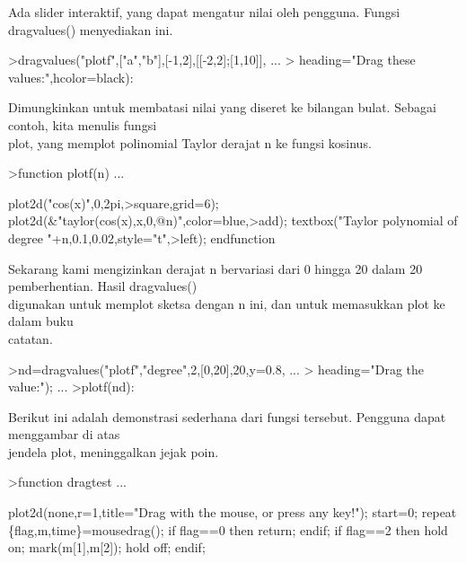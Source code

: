 \documentclass[a4paper,10pt]{article}
\begin{document}
\begin{eulernotebook}
\begin{eulercomment}
\begin{eulercomment}
\begin{eulercomment}
\begin{eulercomment}
\begin{eulercomment}
\begin{eulercomment}
\begin{eulercomment}
Ada slider interaktif, yang dapat mengatur nilai oleh pengguna. Fungsi
dragvalues() menyediakan ini.
\end{eulercomment}
\begin{eulerprompt}
>dragvalues("plotf",["a","b"],[-1,2],[[-2,2];[1,10]], ...
>  heading="Drag these values:",hcolor=black):
\end{eulerprompt}
\begin{eulercomment}
Dimungkinkan untuk membatasi nilai yang diseret ke bilangan bulat.
Sebagai contoh, kita menulis fungsi\\
plot, yang memplot polinomial Taylor derajat n ke fungsi kosinus.
\end{eulercomment}
\begin{eulerprompt}
>function plotf(n) ...
\end{eulerprompt}
\begin{eulerudf}
  plot2d("cos(x)",0,2pi,>square,grid=6);
  plot2d(&"taylor(cos(x),x,0,@n)",color=blue,>add);
  textbox("Taylor polynomial of degree "+n,0.1,0.02,style="t",>left);
  endfunction
\end{eulerudf}
\begin{eulercomment}
Sekarang kami mengizinkan derajat n bervariasi dari 0 hingga 20 dalam
20 pemberhentian. Hasil dragvalues()\\
digunakan untuk memplot sketsa dengan n ini, dan untuk memasukkan plot
ke dalam buku\\
catatan.
\end{eulercomment}
\begin{eulerprompt}
>nd=dragvalues("plotf","degree",2,[0,20],20,y=0.8, ...
>   heading="Drag the value:"); ...
>plotf(nd):
\end{eulerprompt}
\begin{eulercomment}
Berikut ini adalah demonstrasi sederhana dari fungsi tersebut.
Pengguna dapat menggambar di atas\\
jendela plot, meninggalkan jejak poin.
\end{eulercomment}
\begin{eulerprompt}
>function dragtest ...
\end{eulerprompt}
\begin{eulerudf}
    plot2d(none,r=1,title="Drag with the mouse, or press any key!");
    start=0;
    repeat
      \{flag,m,time\}=mousedrag();
      if flag==0 then return; endif;
      if flag==2 then
        hold on; mark(m[1],m[2]); hold off;
      endif;

\end{eulerudf}
\end{eulercomment}
\end{eulercomment}
\end{eulercomment}
\end{eulercomment}
\end{eulercomment}
\end{eulercomment}
\end{eulernotebook}
\end{document}
